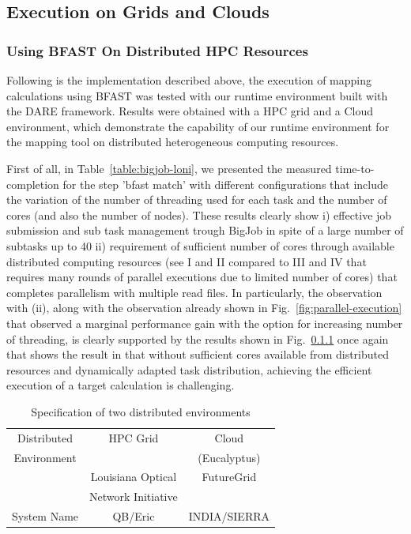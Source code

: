 \documentclass{acm_proc_article-sp}
\begin{document}
\subsection{Execution on Grids and Clouds}

\subsubsection{Using BFAST On Distributed HPC Resources}

Following is the implementation described above, the execution of
mapping calculations using BFAST was tested with our runtime
environment built with the DARE framework.  Results were obtained with
a HPC grid and a Cloud environment, which demonstrate the capability
of our runtime environment for the mapping tool on distributed
heterogeneous computing resources. 

First of all, in Table~\ref{table:bigjob-loni}, we presented the
measured time-to-completion for the step 'bfast match' with different
configurations that include the variation of the number of threading
used for each task and the number of cores (and also the number of
nodes).  These results clearly show i) effective job submission and
sub task management trough BigJob in spite of a large number of
subtasks up to 40 ii) requirement of sufficient number of cores
through available distributed computing resources (see I and II
compared to III and IV that requires many rounds of parallel
executions due to limited number of cores) that completes parallelism
with multiple read files.  In particularly, the observation with (ii),
along with the observation already shown in
Fig.~\ref{fig:parallel-execution} that observed a marginal performance
gain with the option for increasing number of threading, is clearly
supported by the results shown in Fig.~\ref{} once again that shows
the result in that without sufficient cores available from distributed
resources and dynamically adapted task distribution, achieving the
efficient execution of a target calculation is challenging.

\begin{table}
 \begin{tabular}{|c|cc|} 
 \hline 
Distributed &  HPC Grid &  Cloud \\ 
Environment && (Eucalyptus)\\
\hline
 &  Louisiana Optical & FutureGrid \\
& Network Initiative  & \\
System  Name &  QB/Eric   &  INDIA/SIERRA \\
 \hline
 \end{tabular}
\caption{Specification of two distributed environments}
\label{table:two-systems} 
\end{table}
\end{document}
